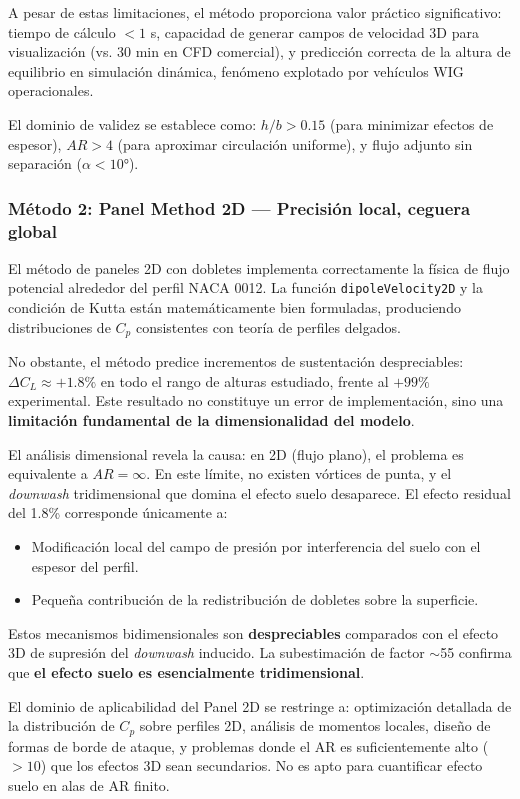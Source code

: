 \documentclass[twocolumn]{article}
\begin{document}
A pesar de estas limitaciones, el método proporciona valor práctico significativo: tiempo de cálculo $< 1$ s, capacidad de generar campos de velocidad 3D para visualización (vs. 30 min en CFD comercial), y predicción correcta de la altura de equilibrio en simulación dinámica, fenómeno explotado por vehículos WIG operacionales.

El dominio de validez se establece como: $h/b > 0.15$ (para minimizar efectos de espesor), $AR > 4$ (para aproximar circulación uniforme), y flujo adjunto sin separación ($\alpha < 10°$).

\subsubsection{Método 2: Panel Method 2D --- Precisión local, ceguera global}

El método de paneles 2D con dobletes implementa correctamente la física de flujo potencial alrededor del perfil NACA 0012. La función \texttt{dipoleVelocity2D} y la condición de Kutta están matemáticamente bien formuladas, produciendo distribuciones de $C_p$ consistentes con teoría de perfiles delgados.

No obstante, el método predice incrementos de sustentación despreciables: $\Delta C_L \approx +1.8\%$ en todo el rango de alturas estudiado, frente al $+99\%$ experimental. Este resultado no constituye un error de implementación, sino una \textbf{limitación fundamental de la dimensionalidad del modelo}.

El análisis dimensional revela la causa: en 2D (flujo plano), el problema es equivalente a $AR = \infty$. En este límite, no existen vórtices de punta, y el \textit{downwash} tridimensional que domina el efecto suelo desaparece. El efecto residual del 1.8\% corresponde únicamente a:

\begin{itemize}
    \item Modificación local del campo de presión por interferencia del suelo con el espesor del perfil.
    \item Pequeña contribución de la redistribución de dobletes sobre la superficie.
\end{itemize}

Estos mecanismos bidimensionales son \textbf{despreciables} comparados con el efecto 3D de supresión del \textit{downwash} inducido. La subestimación de factor $\sim$55 confirma que \textbf{el efecto suelo es esencialmente tridimensional}.

El dominio de aplicabilidad del Panel 2D se restringe a: optimización detallada de la distribución de $C_p$ sobre perfiles 2D, análisis de momentos locales, diseño de formas de borde de ataque, y problemas donde el AR es suficientemente alto ($> 10$) que los efectos 3D sean secundarios. No es apto para cuantificar efecto suelo en alas de AR finito.
\end{document}
